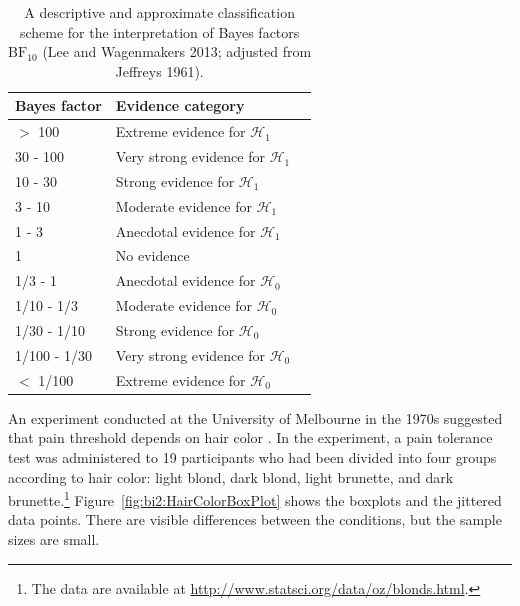 \begin{table}[!h]
\caption{A descriptive and approximate classification scheme for the interpretation of Bayes factors $\text{BF}_{10}$ (Lee and Wagenmakers 2013; adjusted from Jeffreys 1961).}
\begin{center}
\begin{tabular}{llr}
 \toprule
 Bayes factor &  Evidence category \\
 \midrule
 $>$ 100     & Extreme evidence for $\mathcal{H}_1$ \\
 30 - 100    & Very strong evidence for $\mathcal{H}_1$ \\
 10 - 30     & Strong evidence for $\mathcal{H}_1$ \\
  3 - 10     & Moderate evidence for $\mathcal{H}_1$ \\
  1 - 3      & Anecdotal evidence for $\mathcal{H}_1$\\
  1          & No evidence\\

    1/3 - 1    & Anecdotal evidence for $\mathcal{H}_0$  \\
   1/10 - 1/3  & Moderate evidence for $\mathcal{H}_0$ \\
   1/30 - 1/10 & Strong evidence for $\mathcal{H}_0$ \\
  1/100 - 1/30 & Very strong evidence for $\mathcal{H}_0$ \\
  $<$  1/100   & Extreme evidence for $\mathcal{H}_0$ \\
 \bottomrule
\end{tabular}
\end{center}

\label{tab:bi2:BFinterpretation}
\end{table}

An experiment conducted at the University of Melbourne in the 1970s suggested that pain threshold depends on hair color \cite[Exercise 10.20]{McClaveDietrich1991}. In the experiment, a pain tolerance test was administered to 19 participants who had been divided into four groups according to hair color: light blond, dark blond, light brunette, and dark brunette.\footnote{The data are available at \url{http://www.statsci.org/data/oz/blonds.html}.} Figure~\ref{fig:bi2:HairColorBoxPlot} shows the boxplots and the jittered data points. There are visible differences between the conditions, but the sample sizes are small.

